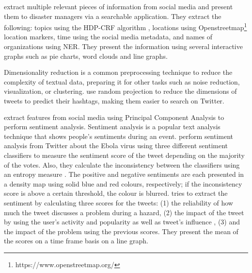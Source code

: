  extract multiple relevant pieces of information from
social media and present them to disaster managers via a searchable application. They extract the
following: topics using the HDP-CRF algorithm \cite{tehHierarchicalBayesianNonparametric2010}, locations
using Openstreetmap\footnote{https://www.openstreetmap.org/} location markers, time using the social
media metadata, and names of organizations using \ac{NER}. They present the information using
several interactive graphs such as pie charts, word clouds and line graphs.

Dimensionality reduction is a common preprocessing technique to reduce the complexity of textual
data, preparing it for other tasks such as noise reduction, visualization, or clustering.
 use random projection to reduce the
dimensions of tweets to predict their hashtags, making them easier to search on Twitter.

 extract features from social media using Principal
Component Analysis to perform sentiment analysis. Sentiment analysis is a popular text analysis
technique that shows people's sentiments during an event. 
perform sentiment analysis from Twitter about the Ebola virus using three different sentiment
classifiers to measure the sentiment score of the tweet depending on the majority of the votes.
Also, they calculate the inconsistency between the classifiers using an entropy measure
\cite{argamon-engelsonCommitteeBasedSampleSelection1999}. The positive and negative sentiments are
each presented in a density map using solid blue and red colours, respectively; if the inconsistency
score is above a certain threshold, the colour is blurred.
 tries to extract the sentiment by calculating
three scores for the tweets: (1) the reliability of how much the tweet discusses a problem during a
hazard, (2) the impact of the tweet by using the user's activity and popularity as well as tweet's
influence \cite{palIdentifyingTopicalAuthorities2011}, (3) and the impact of the
problem using the previous scores. They present the mean of the scores on a time frame basis on a
line graph.

